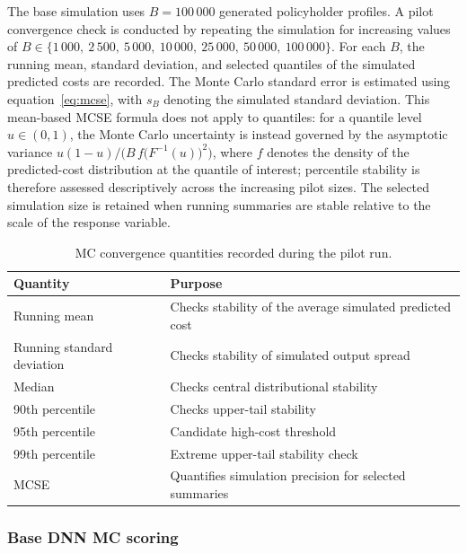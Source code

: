 The base simulation uses $B = 100\,000$ generated policyholder profiles.  A
pilot convergence check is conducted by repeating the simulation for
increasing values of $B \in \{1\,000,\ 2\,500,\ 5\,000,\ 10\,000,\
25\,000,\ 50\,000,\ 100\,000\}$.  For each $B$, the running mean, standard deviation, and
selected quantiles of the simulated predicted costs are recorded.  The Monte
Carlo standard error is estimated using equation~\eqref{eq:mcse}, with
$s_B$ denoting the simulated standard deviation.  This mean-based
MCSE formula does not apply to quantiles: for a quantile level
$u \in (0,1)$, the Monte Carlo uncertainty is instead governed by the
asymptotic variance
$u(1-u)/\bigl(B\,f\bigl(F^{-1}(u)\bigr)^{2}\bigr)$, where $f$ denotes the
density of the predicted-cost distribution at the quantile of interest;
percentile stability is therefore assessed descriptively across the
increasing pilot sizes.  The selected simulation
size is retained when running summaries are stable relative to the scale of
the response variable.

\begin{table}[H]
\centering
\small
\renewcommand{\arraystretch}{1.15}
\begin{tabular}{p{}p{}}
\toprule
\textbf{Quantity} & \textbf{Purpose} \\
\midrule
Running mean & Checks stability of the average simulated predicted cost \\
Running standard deviation & Checks stability of simulated output spread \\
Median & Checks central distributional stability \\
90th percentile & Checks upper-tail stability \\
95th percentile & Candidate high-cost threshold \\
99th percentile & Extreme upper-tail stability check \\
MCSE & Quantifies simulation precision for selected summaries \\
\bottomrule
\end{tabular}
\caption{MC convergence quantities recorded during the pilot run.}
\label{tab:mc_convergence_quantities_ch3}
\end{table}

\subsubsection{Base DNN MC scoring}

